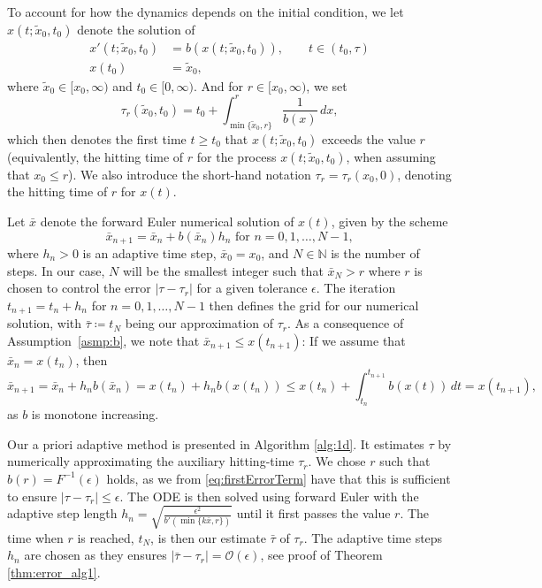 \documentclass[a4paper, oneside, reqno]{amsart}
\newcommand{\abs}[1]{\left\lvert#1\right\rvert}
\newcommand{\N}{\mathbb{N}}
\theoremstyle{remark}
\begin{document}
To account for how the dynamics depends on the initial condition, 
we let \(x(t; \tilde x_0, t_0)\) denote the solution of
\begin{equation*}
\begin{split}
    x'(t; \tilde x_0, t_0) &= b(x(t; \tilde x_0, t_0)),\qquad t\in(t_0,\tau)\\
    x(t_0) &= \tilde x_0,
\end{split}
\end{equation*}
where \(\tilde x_0\in [x_0, \infty)\) and \(t_0 \in [0, \infty)\). And for \(r\in [x_0, \infty)\), we 
set
\begin{equation}\label{eq:tau_1D}
\tau_r(\tilde x_0, t_0) = t_0 + \int_{\min\{\tilde x_0, r\}}^r\frac{1}{b(x)}\,dx,
\end{equation}
which then denotes the first time $t \ge t_0$ that $x(t; \tilde x_0, t_0)$ exceeds the value \(r\) (equivalently, the hitting time of \(r\) for the process \(x(t; \tilde x_0, t_0)\), when assuming that \(x_0 \leq r\)). 
We also introduce the short-hand notation \(\tau_r = \tau_r(x_0, 0)\), denoting the hitting time of \(r\) for \(x(t)\).

Let \(\bar x\) denote the forward Euler numerical solution of \(x(t)\), given by 
the scheme 
\begin{equation*}
    \bar{x}_{n+1} = \bar{x}_{n} + b(\bar{x}_{n})h_{n} \text{ for } n=0, 1, \hdots, N-1,
\end{equation*}
where \(h_{n} >0\) is an adaptive time step, \(\bar x_0 = x_0\), and \(N \in \N\) is the number of steps. 
In our case, \(N\) will be the smallest integer such that \(\bar x_N > r\) where \(r\) is chosen to control the error \(\abs{\tau-\tau_r}\) for a given tolerance \(\epsilon\). 
The iteration \(t_{n+1} = t_{n} + h_{n}\) for \(n = 0, 1, \hdots, N-1\) then defines the grid for our numerical solution, with \(\bar\tau \coloneqq t_N\) being our approximation of \(\tau_r\). 
As a consequence of Assumption~\ref{asmp:b}, we note that  \(\bar x_{n+1} \leq x(t_{n+1})\): If we assume that \(\bar x_n = x(t_n)\), then  
\begin{equation}
\label{eq:xBarBndX}
    \bar{x}_{n+1} = \bar x_n + h_nb(\bar x_n) = x(t_n) + h_nb(x(t_n)) \leq x(t_n) + \int_{t_n}^{t_{n+1}}b(x(t))\,dt = x(t_{n+1}),
\end{equation}
as \(b\) is monotone increasing. 

Our a priori adaptive method is presented in Algorithm \ref{alg:1d}. 
It estimates \(\tau\) by numerically approximating the auxiliary hitting-time \(\tau_r\). 
We chose \(r\) such that \(b(r) = F^{-1}(\epsilon)\) holds, as we from \eqref{eq:firstErrorTerm} have that this is sufficient to ensure \(\abs{\tau-\tau_r} \leq \epsilon\). 
The ODE is then solved using forward Euler with the adaptive step length \(h_n = \sqrt{\frac{\epsilon^2}{b'(\min\{k\bar x, r\})}}\) until it first passes the value \(r\). 
The time when \(r\) is reached, \(t_N\), is then our estimate \(\bar \tau\) of \(\tau_r\). 
The adaptive time steps \(h_n\) are chosen as they ensures \(\abs{\bar\tau - \tau_r} = \mathcal{O}(\epsilon)\), see proof of Theorem \ref{thm:error_alg1}.
\end{document}
